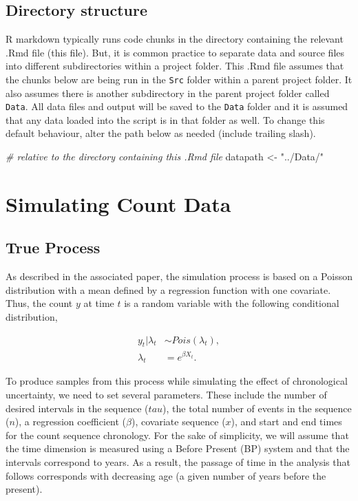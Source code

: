 \documentclass[]{article}
\newenvironment{Shaded}{\begin{snugshade}}{\end{snugshade}}
\newcommand{\StringTok}[1]{\textcolor[rgb]{0.31,0.60,0.02}{#1}}
\newcommand{\CommentTok}[1]{\textcolor[rgb]{0.56,0.35,0.01}{\textit{#1}}}
\newcommand{\NormalTok}[1]{#1}
\begin{document}
\subsection{Directory structure}\label{directory-structure}

R markdown typically runs code chunks in the directory containing the
relevant .Rmd file (this file). But, it is common practice to separate
data and source files into different subdirectories within a project
folder. This .Rmd file assumes that the chunks below are being run in
the \texttt{Src} folder within a parent project folder. It also assumes
there is another subdirectory in the parent project folder called
\texttt{Data}. All data files and output will be saved to the
\texttt{Data} folder and it is assumed that any data loaded into the
script is in that folder as well. To change this default behaviour,
alter the path below as needed (include trailing slash).

\begin{Shaded}
\begin{Highlighting}[]
\CommentTok{# relative to the directory containing this .Rmd file}
\NormalTok{datapath <-}\StringTok{ "../Data/"}
\end{Highlighting}
\end{Shaded}

\section{Simulating Count Data}\label{simulating-count-data}

\subsection{True Process}\label{true-process}

As described in the associated paper, the simulation process is based on
a Poisson distribution with a mean defined by a regression function with
one covariate. Thus, the count \(y\) at time \(t\) is a random variable
with the following conditional distribution,

\begin{align}
    y_t | \lambda_t &\sim Pois(\lambda_t), \\
    \lambda_t &= e^{\beta X_t}.
\end{align}

To produce samples from this process while simulating the effect of
chronological uncertainty, we need to set several parameters. These
include the number of desired intervals in the sequence (\(tau\)), the
total number of events in the sequence (\(n\)), a regression coefficient
(\(\beta\)), covariate sequence (\(x\)), and start and end times for the
count sequence chronology. For the sake of simplicity, we will assume
that the time dimension is measured using a Before Present (BP) system
and that the intervals correspond to years. As a result, the passage of
time in the analysis that follows corresponds with decreasing age (a
given number of years before the present).
\end{document}
